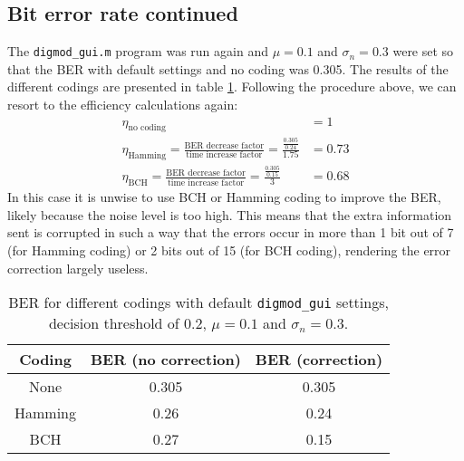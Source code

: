 \documentclass[11pt,titlepage]{report}
\begin{document}
\subsection{Bit error rate continued}
The \texttt{digmod\_gui.m} program was run again and $\mu=0.1$ and $\sigma_n=0.3$ were set so that the BER with default settings and no coding was 0.305. The results of the different codings are presented in table \ref{tab:task4-diff-coding-mu-sigma}. Following the procedure above, we can resort to the efficiency calculations again:
\begin{align*}
\eta_{\text{no coding}}&=1\\
\eta_{\text{Hamming}}=\frac{\text{BER decrease factor}}{\text{time increase factor}}=\frac{\frac{0.305}{0.24}}{1.75}&=0.73\\
\eta_{\text{BCH}}=\frac{\text{BER decrease factor}}{\text{time increase factor}}=\frac{\frac{0.305}{0.15}}{3}&=0.68
\end{align*}
In this case it is unwise to use BCH or Hamming coding to improve the BER, likely because the noise level is too high. This means that the extra information sent is corrupted in such a way that the errors occur in more than 1 bit out of 7 (for Hamming coding) or 2 bits out of 15 (for BCH coding), rendering the error correction largely useless.
\begin{table}[H]
	\centering
	\caption{BER for different codings with default \texttt{digmod\_gui} settings, decision threshold of 0.2, $\mu=0.1$ and $\sigma_n=0.3$.}
	\label{tab:task4-diff-coding-mu-sigma}
	\begin{tabular}{c c c}
		\hline\hline
		Coding & BER (no correction) & BER (correction)\\
		\hline
		None & 0.305 & 0.305\\
		Hamming & 0.26 & 0.24 \\
		BCH & 0.27 & 0.15\\
		\hline
	\end{tabular}
\end{table}
\end{document}
